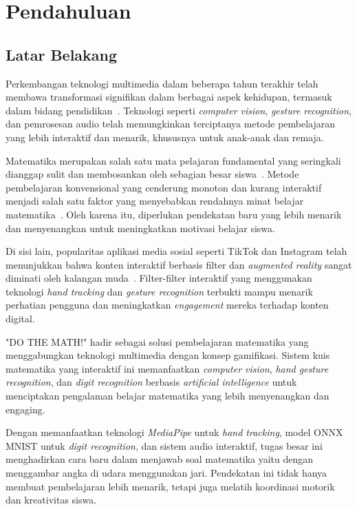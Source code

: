 \section{Pendahuluan}
\subsection{Latar Belakang}
Perkembangan teknologi multimedia dalam beberapa tahun terakhir telah membawa transformasi signifikan dalam berbagai aspek kehidupan, termasuk dalam bidang pendidikan~\cite{nautica2022ta}. Teknologi seperti \textit{computer vision}, \textit{gesture recognition}, dan pemrosesan audio telah memungkinkan terciptanya metode pembelajaran yang lebih interaktif dan menarik, khususnya untuk anak-anak dan remaja.

Matematika merupakan salah satu mata pelajaran fundamental yang seringkali dianggap sulit dan membosankan oleh sebagian besar siswa~\cite{kholil2020faktor}. Metode pembelajaran konvensional yang cenderung monoton dan kurang interaktif menjadi salah satu faktor yang menyebabkan rendahnya minat belajar matematika~\cite{primrose2024analisis}. Oleh karena itu, diperlukan pendekatan baru yang lebih menarik dan menyenangkan untuk meningkatkan motivasi belajar siswa.

Di sisi lain, popularitas aplikasi media sosial seperti TikTok dan Instagram telah menunjukkan bahwa konten interaktif berbasis filter dan \textit{augmented reality} sangat diminati oleh kalangan muda~\cite{yusup2023literature}. Filter-filter interaktif yang menggunakan teknologi \textit{hand tracking} dan \textit{gesture recognition} terbukti mampu menarik perhatian pengguna dan meningkatkan \textit{engagement} mereka terhadap konten digital.

"DO THE MATH!" hadir sebagai solusi pembelajaran matematika yang menggabungkan teknologi multimedia dengan konsep gamifikasi. Sistem kuis matematika yang interaktif ini memanfaatkan \textit{computer vision}, \textit{hand gesture recognition}, dan \textit{digit recognition} berbasis \textit{artificial intelligence} untuk menciptakan pengalaman belajar matematika yang lebih menyenangkan dan engaging.

Dengan memanfaatkan teknologi \textit{MediaPipe} untuk \textit{hand tracking}, model ONNX MNIST untuk \textit{digit recognition}, dan sistem audio interaktif, tugas besar ini menghadirkan cara baru dalam menjawab soal matematika yaitu dengan menggambar angka di udara menggunakan jari. Pendekatan ini tidak hanya membuat pembelajaran lebih menarik, tetapi juga melatih koordinasi motorik dan kreativitas siswa.


